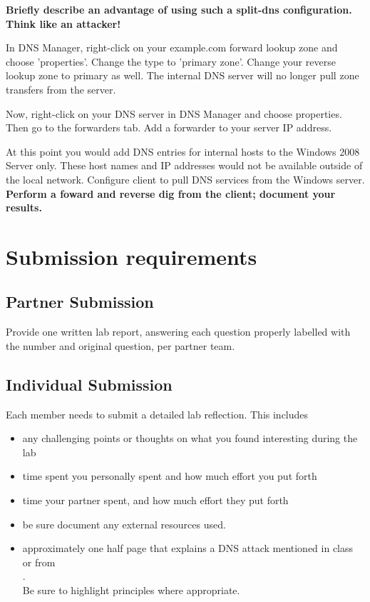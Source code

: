 \documentclass{article}
\begin{document}
\textbf{\question  Briefly describe an advantage of using such a split-dns configuration. Think like an attacker!}


In DNS Manager, right-click on your example.com forward lookup zone and choose 'properties'. Change the type to 'primary zone'. Change your reverse lookup zone to primary as well. The internal DNS server will no longer pull zone transfers from the \ubuntu server.

Now, right-click on your DNS server in DNS Manager and choose properties. Then go to the forwarders tab. Add a forwarder to your \ubuntu server IP address.

At this point you would add DNS entries for internal hosts to the Windows 2008 Server only. These host names and IP addresses would not be available outside of the local network.  Configure client \ubuntu to pull DNS services from the Windows server.\\

\textbf{\question  Perform a foward and reverse dig from the client; document your results.}

\section{Submission requirements}
\subsection{Partner Submission}
Provide one written lab report, answering each question properly labelled with the number and original question, per partner team. 

\subsection{Individual Submission}
Each member needs to submit a detailed lab reflection. This includes 
\begin{itemize}
\item any challenging points or thoughts on what you found interesting during the lab 
\item time spent you personally spent and how much effort you put forth
\item time your partner spent, and how much effort they put forth
\item be sure document any external resources used. 
\item  approximately one half page that explains a DNS attack mentioned in class or from \\{}. \\ Be sure to highlight principles where appropriate.
\end{itemize}
\end{document}
